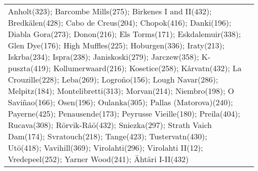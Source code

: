 \documentclass[journal abbreviation, manuscript]{copernicus}
\begin{document}
\begin{table}
\begin{tabularx}{\textwidth}{lX}
                                                                                                                                                                                                                                                                                                                                                                                                                                                                                                                                                                                                                                                                                                                                                                                                                                                                                                                                                                                                                                                                                                                                                                                                                                                                                                                                           Anholt(323); Barcombe Mills(275); Birkenes I and II(432); Bredkälen(428); Cabo de Creus(204); Chopok(416); Danki(196); Diabla Gora(273); Donon(216); Els Torms(171); Eskdalemuir(338); Glen Dye(176); High Muffles(225); Hoburgen(336); Iraty(213); Iskrba(234); Ispra(238); Janiskoski(279); Jarczew(358); K-puszta(419); Kollumerwaard(216); Kosetice(258); Kårvatn(432); La Crouzille(228); Leba(269); Logroño(156); Lough Navar(286); Melpitz(184); Montelibretti(313); Morvan(214); Niembro(198); O Saviñao(166); Osen(196); Oulanka(305); Pallas (Matorova)(240); Payerne(425); Penausende(173); Peyrusse Vieille(180); Preila(404); Rucava(308); Rörvik-Råö(432); Sniezka(297); Strath Vaich Dam(174); Svratouch(218); Tange(423); Tustervatn(430); Utö(418); Vavihill(369); Virolahti(296); Virolahti II(12); Vredepeel(252); Yarner Wood(241); Ähtäri I-II(432) \\

\end{tabularx}
\end{table}
\end{document}
